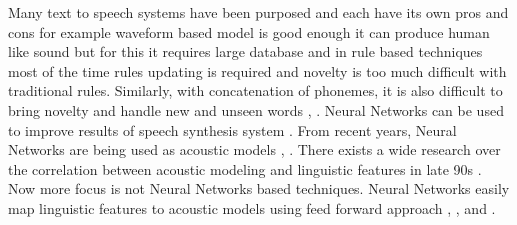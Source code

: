 Many text to speech systems have been purposed and each have its own pros and cons for example waveform based model is good enough it can produce human like sound but for this it requires large database and in rule based techniques most of the time rules updating is required and novelty is too much difficult with traditional rules. Similarly, with concatenation of phonemes, it is also difficult to bring novelty and handle new and unseen words \cite{karaali1998text}, \cite{pitrelli2004tobi}. Neural Networks can be used to improve results of speech synthesis system \cite{muthukumar2016recurrent}. From recent years, Neural Networks are being used as acoustic models \cite{ling2015deep}, \cite{zen2015acoustic}. There exists a wide research over the correlation between acoustic modeling and linguistic features in late 90s \cite{cawley1993lsp}. Now more focus is not Neural Networks based techniques. Neural Networks easily map linguistic features to acoustic models using feed forward approach \cite{lu2013combining}, \cite{qian2014training}, \cite{chen2015deep} and \cite{ze2013statistical}. 